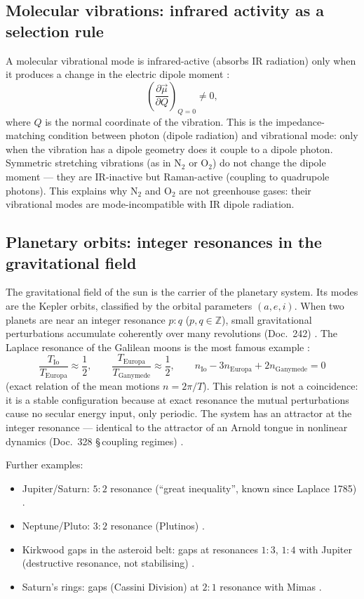 \subsection*{Molecular vibrations: infrared activity as a selection rule}

A molecular vibrational mode is infrared-active (absorbs IR radiation) only
when it produces a change in the electric dipole moment
\cite{Atkins2010,Wilson1955}:
\[
  \left(\frac{\partial \vec{\mu}}{\partial Q}\right)_{Q=0} \neq 0,
\]
where $Q$ is the normal coordinate of the vibration. This is the
impedance-matching condition between photon (dipole radiation) and
vibrational mode: only when the vibration has a dipole geometry does it
couple to a dipole photon. Symmetric stretching vibrations (as in N$_2$
or O$_2$) do not change the dipole moment --- they are IR-inactive but
Raman-active (coupling to quadrupole photons). This explains why N$_2$
and O$_2$ are not greenhouse gases: their vibrational modes are mode-incompatible
with IR dipole radiation.

\subsection*{Planetary orbits: integer resonances in the gravitational field}

The gravitational field of the sun is the carrier of the planetary system.
Its modes are the Kepler orbits, classified by the orbital parameters
$(a, e, i)$. When two planets are near an integer resonance $p:q$
($p, q \in \mathbb{Z}$), small gravitational perturbations accumulate
coherently over many revolutions (Doc.~242) \cite{PascherDok242,Murray1999}.
The Laplace resonance of the Galilean moons is the most famous example
\cite{Murray1999,Peale1979}:
\[
  \frac{T_\mathrm{Io}}{T_\mathrm{Europa}} \approx \frac{1}{2},
  \qquad
  \frac{T_\mathrm{Europa}}{T_\mathrm{Ganymede}} \approx \frac{1}{2},
  \qquad
  n_\mathrm{Io} - 3n_\mathrm{Europa} + 2n_\mathrm{Ganymede} = 0
\]
(exact relation of the mean motions $n = 2\pi/T$). This relation is not
a coincidence: it is a stable configuration because at exact resonance the
mutual perturbations cause no secular energy input, only periodic. The
system has an attractor at the integer resonance --- identical to the
attractor of an Arnold tongue in nonlinear dynamics (Doc.~328
\S\,coupling regimes) \KM.

Further examples:
\begin{itemize}[nosep]
  \item Jupiter/Saturn: $5:2$ resonance (``great inequality'',
    known since Laplace 1785) \QM.
  \item Neptune/Pluto: $3:2$ resonance (Plutinos) \QM.
  \item Kirkwood gaps in the asteroid belt: gaps at resonances $1:3$,
    $1:4$ with Jupiter (destructive resonance, not stabilising) \QM.
  \item Saturn's rings: gaps (Cassini Division) at $2:1$ resonance
    with Mimas \QM.
\end{itemize}

